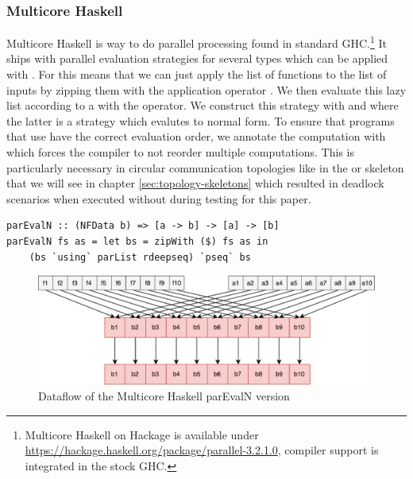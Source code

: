 \subsubsection{Multicore Haskell}
Multicore Haskell \cite{Marlow2009,Trinder1999} is way to do parallel processing found in standard GHC.\footnote{Multicore Haskell on Hackage is available under \url{https://hackage.haskell.org/package/parallel-3.2.1.0}, compiler support is integrated in the stock GHC.} It ships with parallel evaluation strategies \cite{Trinder1998a,Marlow2010} for several types which can be applied with . For  this means that we can just apply the list of functions \inlinecode{[a -> b]} to the list of inputs \inlinecode{[a]} by zipping them with the application operator \inlinecode{\$}. We then evaluate this lazy list \inlinecode{[b]} according to a  with the  operator. We construct this strategy with  and  where the latter is a strategy which evalutes to normal form. To ensure that programs that use  have the correct evaluation order, we annotate the computation with  which forces the compiler to not reorder multiple  computations. This is particularly necessary in circular communication topologies like in the  or  skeleton that we will see in chapter \ref{sec:topology-skeletons} which resulted in deadlock scenarios when executed without  during testing for this paper.

\begin{lstlisting}[frame=htrbl]
parEvalN :: (NFData b) => [a -> b] -> [a] -> [b]
parEvalN fs as = let bs = zipWith ($) fs as in
	(bs `using` parList rdeepseq) `pseq` bs
\end{lstlisting}
\begin{figure}[h]
	\includegraphics[scale=0.5]{images/parEvalNMulticore}
	\caption{Dataflow of the Multicore Haskell parEvalN version}
\end{figure} %

